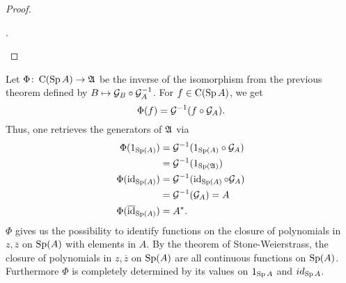 \begin{proof}
\begin{center}
 .
 \end{center}

 




\end{proof}

\begin{rem}
  Let $\Phi \colon \operatorname{C} (\operatorname{Sp} A) \to \mathfrak{A}$ be the inverse of the isomorphism from the
  previous theorem defined by $B \mapsto \mathcal{G}_B \circ \mathcal{G}_A ^{-1}$.
   For $f \in \operatorname{C}(\operatorname{Sp} A)$, we get 
  \[
   \Phi (f) = \mathcal{G} ^{-1} (f \circ \mathcal{G}_A).
  \]
  Thus, one retrieves the generators of $\mathfrak{A}$ via
   \begin{align*}
      \Phi (1_{\operatorname{Sp}(A)})   		&= \mathcal{G} ^{-1} (1 _{\operatorname{Sp}(A)} \circ \mathcal{G}_A ) \\
				    &= \mathcal{G} ^{-1} (1_{\operatorname{Sp}(\mathfrak{A})}) \\
      \Phi (\operatorname{id}_{\operatorname{Sp} (A)})		&= \mathcal{G} ^{-1} (\operatorname{id}_{\operatorname{Sp} (A)} \circ \mathcal{G}_A) \\
				    &= \mathcal{G} ^{-1} (\mathcal{G}_A) = A \\
      \Phi (\overline{\operatorname{id}}_{\operatorname{Sp} (A)}) 	&= A^*.
   \end{align*}
  $\Phi$ gives us the possibility to identify functions on the closure of
  polynomials in $z, \overline{z}$ on $\operatorname{Sp} (A)$ with elements in $A$. 
  By the theorem of Stone-Weierstrass, the closure of polynomials in 
  $z, \overline{z}$ on $\operatorname{Sp} (A)$ are all continuous functions on $\operatorname{Sp} (A)$.
  Furthermore  $\Phi$ is completely determined by its values on $1_{\operatorname{Sp} A}$ 
  and $id_{\operatorname{Sp} A}$.
\end{rem}

